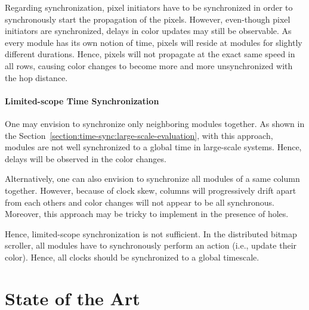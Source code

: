 Regarding synchronization, pixel initiators have to be synchronized in order to synchronously start the propagation of the pixels. However, even-though pixel initiators are synchronized, delays in color updates may still be observable. As every module has its own notion of time, pixels will reside at modules for slightly different durations. Hence, pixels will not propagate at the exact same speed in all rows, causing color changes to become more and more unsynchronized with the hop distance.

\paragraph{Limited-scope Time Synchronization}

One may envision to synchronize only neighboring modules together. As shown in the Section~\ref{section:time-sync:large-scale-evaluation}, with this approach, modules are not well synchronized to a global time in large-scale systems. Hence, delays will be observed in the color changes.

Alternatively, one can also envision to synchronize all modules of a same column together. However, because of clock skew, columns will progressively drift apart from each others and color changes will not appear to be all synchronous. Moreover, this approach may be tricky to implement in the presence of holes.

Hence, limited-scope synchronization is not sufficient. In the distributed bitmap scroller, all modules have to synchronously perform an action (i.e., update their color). Hence, all clocks should be synchronized to a global timescale.

\section{State of the Art}

\label{section:time-sync:related-works}

